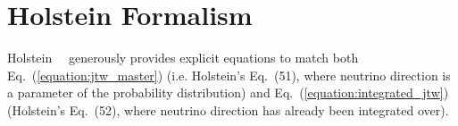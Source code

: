 




\section[Holstein Formalism]{Holstein Formalism} 
\label{sec:holstein_formalism}
Holstein~\cite{holstein}~\cite{holstein_errata} generously provides explicit equations to match both Eq.~(\ref{equation:jtw_master}) (i.e. Holstein's Eq.~(51), where neutrino direction is a parameter of the probability distribution) and Eq.~(\ref{equation:integrated_jtw}) (Holstein's Eq.~(52), where neutrino direction has already been integrated over).  



